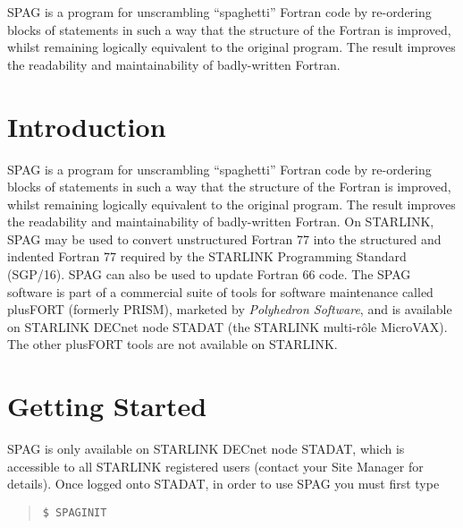 \documentclass[11pt,twoside]{article}
\newcommand{\stardocinitials}  {SUN}
\newcommand{\stardocnumber}    {63.4}
\newcommand{\stardocabstract}  {
SPAG is a program for unscrambling ``spaghetti'' Fortran code by
re-ordering blocks of statements in such a way that the structure of the
Fortran is improved, whilst remaining logically equivalent to the original
program.
The result improves the readability and maintainability of badly-written
Fortran.
}
\newcommand{\stardocname}{\stardocinitials /\stardocnumber}
\newenvironment{latexonly}{}{}
\newcommand{\xref}[3]{#1}
\newcommand{\xlabel}[1]{}
\renewcommand{\thepage}{\roman{page}}
\begin{document}
\stardocabstract
\newpage
\begin{latexonly}
   \setlength{\parskip}{0mm}
   \tableofcontents
   \setlength{\parskip}{\medskipamount}
   \markright{\stardocname}
\end{latexonly}
\newpage
\renewcommand{\thepage}{\arabic{page}}
\setcounter{page}{1}

\section {Introduction\xlabel{introduction}}

SPAG is a program for unscrambling ``spaghetti'' Fortran code by
re-ordering blocks of statements in such a way that the structure of the
Fortran is improved, whilst remaining logically equivalent to the original
program.
The result improves the readability and maintainability of badly-written
Fortran.
On STARLINK, SPAG may be used to convert unstructured Fortran
77 into the structured and indented Fortran 77 required by the
STARLINK Programming Standard
(\xref{SGP/16}{sgp16}{}).
SPAG can also be used to update Fortran 66 code.
The SPAG software is part of a commercial suite of tools for software
maintenance called plusFORT (formerly PRISM), marketed by {\it Polyhedron
Software}, and is available on STARLINK DECnet node STADAT (the STARLINK
multi-r\^{o}le MicroVAX).
The other plusFORT tools are not available on STARLINK.


\section{Getting Started\xlabel{getting_started}}

SPAG is only available on STARLINK DECnet node STADAT, which is accessible
to all STARLINK registered users (contact your Site Manager for details).
Once logged onto STADAT, in order to use SPAG you must first type

\begin {quote}
\begin{verbatim}
$ SPAGINIT
\end{verbatim}
\end {quote}
\end{document}
